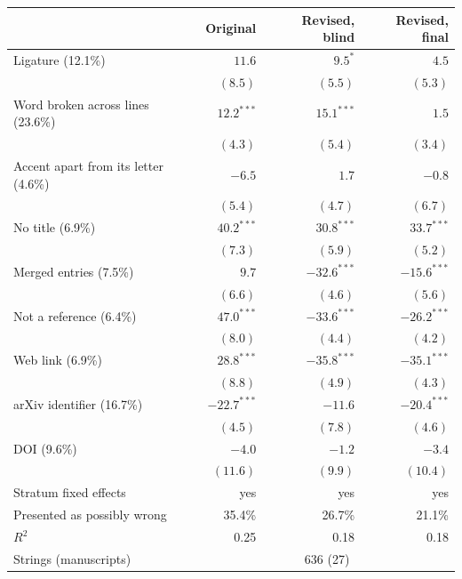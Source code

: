 \begin{tabular}{lrrr}
\toprule
& \textbf{Original} & \textbf{Revised, blind} & \textbf{Revised, final} \\
\midrule
Ligature (12.1\%) & $11.6$ & $9.5^{*}$ & $4.5$ \\
 & $(8.5)$ & $(5.5)$ & $(5.3)$ \\
Word broken across lines (23.6\%) & $12.2^{***}$ & $15.1^{***}$ & $1.5$ \\
 & $(4.3)$ & $(5.4)$ & $(3.4)$ \\
Accent apart from its letter (4.6\%) & $-6.5$ & $1.7$ & $-0.8$ \\
 & $(5.4)$ & $(4.7)$ & $(6.7)$ \\
No title (6.9\%) & $40.2^{***}$ & $30.8^{***}$ & $33.7^{***}$ \\
 & $(7.3)$ & $(5.9)$ & $(5.2)$ \\
Merged entries (7.5\%) & $9.7$ & $-32.6^{***}$ & $-15.6^{***}$ \\
 & $(6.6)$ & $(4.6)$ & $(5.6)$ \\
Not a reference (6.4\%) & $47.0^{***}$ & $-33.6^{***}$ & $-26.2^{***}$ \\
 & $(8.0)$ & $(4.4)$ & $(4.2)$ \\
Web link (6.9\%) & $28.8^{***}$ & $-35.8^{***}$ & $-35.1^{***}$ \\
 & $(8.8)$ & $(4.9)$ & $(4.3)$ \\
arXiv identifier (16.7\%) & $-22.7^{***}$ & $-11.6$ & $-20.4^{***}$ \\
 & $(4.5)$ & $(7.8)$ & $(4.6)$ \\
DOI (9.6\%) & $-4.0$ & $-1.2$ & $-3.4$ \\
 & $(11.6)$ & $(9.9)$ & $(10.4)$ \\
\midrule
Stratum fixed effects & yes & yes & yes \\
Presented as possibly wrong & 35.4\% & 26.7\% & 21.1\% \\
$R^2$ & 0.25 & 0.18 & 0.18 \\
Strings (manuscripts) & \multicolumn{3}{c}{636 (27)} \\
\bottomrule
\end{tabular}
